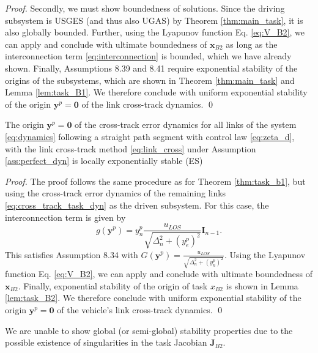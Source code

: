\documentclass[../main.tex]{subfiles}
\begin{document}
\begin{proof}
    Secondly, we must show boundedness of solutions. Since the driving subsystem is USGES (and thus also UGAS) by Theorem \ref{thm:main_task}, it is also globally bounded. Further, using the Lyapunov function Eq. \eqref{eq:V_B2}, we can apply \cite[Theorem 4.18]{khalil2002} and conclude with ultimate boundedness of $\bm{x}_{B2}$ as long as the interconnection term \eqref{eq:interconnection} is bounded, which we have already shown. Finally, Assumptions 8.39 and 8.41 require exponential stability of the origins of the subsystems, which are shown in  Theorem \ref{thm:main_task} and Lemma \ref{lem:task_B1}. We therefore conclude with uniform exponential stability of the origin $\bm{y}^p = \bm{0}$ of the link cross-track dynamics. \qed
\end{proof}

\begin{theorem}
    \label{thm:task_b2}
    The origin $\bm{y}^p = \bm{0}$ of the cross-track error dynamics for all links of the system \eqref{eq:dynamics} following a straight path segment with control law \eqref{eq:zeta_d}, with the link cross-track method \eqref{eq:link_cross} under Assumption \ref{ass:perfect_dyn} is locally exponentially stable (ES)
\end{theorem}
\begin{proof}
    The proof follows the same procedure as for Theorem \ref{thm:task_b1}, but using the cross-track error dynamics of the remaining links \eqref{eq:cross_track_task_dyn} as the driven subsystem. For this case, the interconnection term is given by
    \begin{equation}
        \label{eq:interconnection}
        g(\bm{y}^p) = y_n^p\frac{u_{LOS}}{\sqrt{\Delta_n^2 + (y_e^p)^2}} \bm{I}_{n-1}.
    \end{equation}
    This satisfies Assumption 8.34 with $G(\bm{y}^p) = \frac{u_{LOS}}{\sqrt{\Delta_n^2 + (y_n^p)^2}}$. Using the Lyapunov function Eq. \eqref{eq:V_B2}, we can apply \cite[Theorem 4.18]{khalil2002} and conclude with ultimate boundedness of $\bm{x}_{B2}$. Finally, exponential stability of the origin of task $x_{B2}$ is shown in Lemma \ref{lem:task_B2}. We therefore conclude with uniform exponential stability of the origin $\bm{y}^p = \bm{0}$ of the vehicle's link cross-track dynamics. \qed
\end{proof}

\begin{remark}
    We are unable to show global (or semi-global) stability properties due to the possible existence of singularities in the task Jacobian $\bm{J}_{B2}$.
\end{remark}
\end{document}
